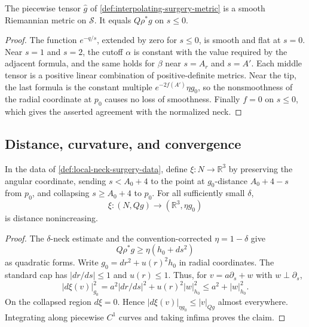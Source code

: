 \begin{lemma}
\label{lem:interpolating-surgery-metric-smooth}
\notready
The piecewise tensor $\widehat g$ of
\ref{def:interpolating-surgery-metric} is a smooth Riemannian metric on
$\mathcal S$.  It equals $Q\rho^*g$ on $s\le0$.
\end{lemma}

\begin{proof}
The function $e^{-q/s}$, extended by zero for $s\le0$, is smooth and flat
at $s=0$.  Near $s=1$ and $s=2$, the cutoff $\alpha$ is constant with the
value required by the adjacent formula, and the same holds for $\beta$
near $s=A_r$ and $s=A'$.  Each middle tensor is a positive linear
combination of positive-definite metrics.  Near the tip, the last formula
is the constant multiple $e^{-2f(A')}\eta g_0$, so the nonsmoothness of the
radial coordinate at $p_0$ causes no loss of smoothness.  Finally $f=0$ on
$s\le0$, which gives the asserted agreement with the normalized neck.
\end{proof}

\subsection{Distance, curvature, and convergence}

\begin{lemma}
\label{lem:standard-cap-radial-collapse-nonexpanding}
\notready
In the data of \ref{def:local-neck-surgery-data}, define
$\xi\colon N\to\mathbb R^3$ by preserving the angular coordinate,
sending $s<A_0+4$ to the point at $g_0$-distance $A_0+4-s$ from $p_0$,
and collapsing $s\ge A_0+4$ to $p_0$.  For all sufficiently small
$\delta$,
\[
 \xi\colon(N,Qg)\longrightarrow(\mathbb R^3,\eta g_0)
\]
is distance nonincreasing.
\end{lemma}

\begin{proof}
The $\delta$-neck estimate and the convention-corrected
$\eta=1-\delta$ give
\[
 Q\rho^*g\ge\eta(h_0+ds^2)
\]
as quadratic forms.  Write $g_0=dr^2+u(r)^2h_0$ in radial coordinates.
The standard cap has $|dr/ds|\le1$ and $u(r)\le1$.  Thus, for
$v=a\partial_s+w$ with $w\perp\partial_s$,
\[
 |d\xi(v)|_{g_0}^2
 =a^2|dr/ds|^2+u(r)^2|w|_{h_0}^2
 \le a^2+|w|_{h_0}^2.
\]
On the collapsed region $d\xi=0$.  Hence
$|d\xi(v)|_{\eta g_0}\le|v|_{Qg}$ almost everywhere.  Integrating along
piecewise $C^1$ curves and taking infima proves the claim.
\end{proof}

